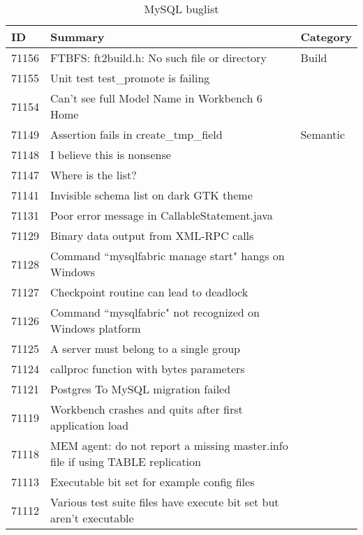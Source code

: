 \begin{longtable}[c]{p{1cm}p{8cm}p{3cm}}
\caption{MySQL buglist}
\label{tab:mysqlbuglist}\\
ID & Summary & Category \\
\endfirsthead
%
\endhead
%
71156 & FTBFS: ft2build.h: No such file or directory & Build \\
71155 & Unit test test\_promote is failing &  \\
71154 & Can't see full Model Name in Workbench 6 Home &  \\
71149 & Assertion fails in create\_tmp\_field & Semantic \\
71148 & I believe this is nonsense &  \\
71147 & Where is the list? &  \\
71141 & Invisible schema list on dark GTK theme &  \\
71131 & Poor error message in CallableStatement.java &  \\
71129 & Binary data output from XML-RPC calls &  \\
71128 & Command ``mysqlfabric manage start" hangs on Windows &  \\
71127 & Checkpoint routine can lead to deadlock &  \\
71126 & Command ``mysqlfabric" not recognized on Windows platform &  \\
71125 & A server must belong to a single group &  \\
71124 & callproc function with bytes parameters &  \\
71121 & Postgres To MySQL migration failed &  \\
71119 & Workbench crashes and quits after first application load &  \\
71118 & MEM agent: do not report a missing master.info file if using TABLE replication &  \\
71113 & Executable bit set for example config files &  \\
71112 & Various test suite files have execute bit set but aren't executable &  \\

\end{longtable}
